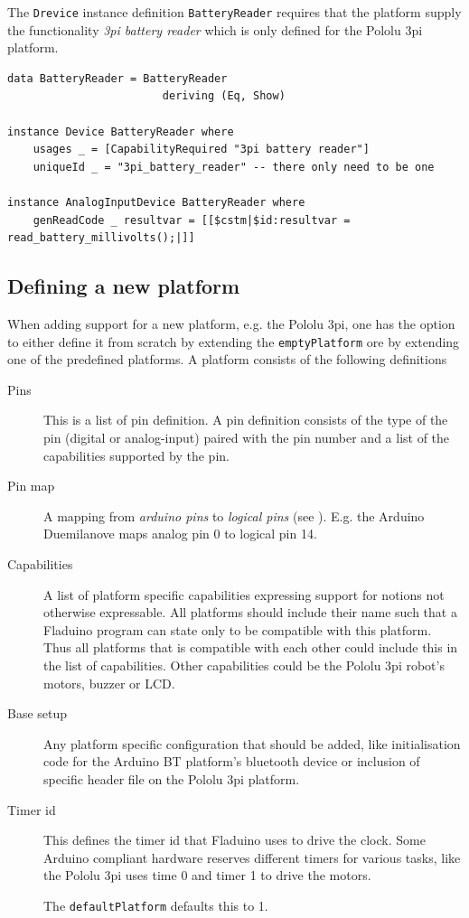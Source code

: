 \documentclass[a4paper, oneside, final]{memoir}
\let\Fref\undefined
\begin{document}
The \texttt{Drevice} instance definition \texttt{BatteryReader} requires that the
platform supply the functionality \textit{3pi battery reader} which is only
defined for the Pololu 3pi platform.

\begin{verbatim}
data BatteryReader = BatteryReader
                        deriving (Eq, Show)

instance Device BatteryReader where
    usages _ = [CapabilityRequired "3pi battery reader"]
    uniqueId _ = "3pi_battery_reader" -- there only need to be one

instance AnalogInputDevice BatteryReader where
    genReadCode _ resultvar = [[$cstm|$id:resultvar = read_battery_millivolts();|]]
\end{verbatim}


\subsection{Defining a new platform}

When adding support for a new platform, e.g. the Pololu 3pi, one has the option
to either define it from scratch by extending the \texttt{emptyPlatform} ore by
extending one of the predefined platforms. A platform consists of the following
definitions

\begin{description}
\item[Pins] This is a list of pin definition. A pin definition
  consists of the type of the pin (digital or analog-input) paired
  with the pin number and a list of the capabilities supported by the
  pin.

\item[Pin map] A mapping from \textit{arduino pins} to
  \textit{logical pins} (see \Fref{sec:pins}).  E.g. the Arduino
  Duemilanove maps analog pin 0 to logical pin 14.

\item[Capabilities] A list of platform specific capabilities
  expressing support for notions not otherwise expressable.  All
  platforms should include their name such that a Fladuino program can
  state only to be compatible with this platform. Thus all platforms
  that is compatible with each other could include this in the list of
  capabilities. Other capabilities could be the Pololu 3pi robot's
  motors, buzzer or LCD.

\item[Base setup] Any platform specific configuration that should be
  added, like initialisation code for the Arduino BT platform's
  bluetooth device or inclusion of specific header file on the Pololu
  3pi platform.

\item[Timer id] This defines the timer id that Fladuino uses to drive
  the clock. Some Arduino compliant hardware reserves different timers
  for various tasks, like the Pololu 3pi uses time 0 and timer 1 to
  drive the motors.

  The \texttt{defaultPlatform} defaults this to 1.
\end{description}
\end{document}
